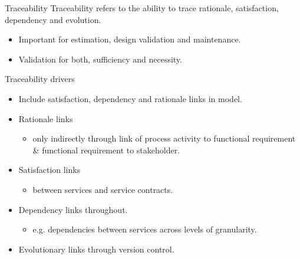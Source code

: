 
\begin{frame}{Traceability}
  Traceability refers to the ability to trace rationale, satisfaction, dependency and evolution.
    \begin{itemize}
     \item Important for estimation, design validation and maintenance.
     \item Validation for both, sufficiency and necessity.
    \end{itemize}
  \pause
  \begin{block}{Traceability drivers}
    \begin{itemize}
		\item<+-| alert@+> Include satisfaction, dependency and rationale links in model.
		\item<+-| alert@+> Rationale links
		  \begin{itemize}
		   \item  only indirectly through link of process activity to functional requirement \& functional requirement to stakeholder.
		  \end{itemize}
      \item<+-| alert@+> Satisfaction links
		  \begin{itemize}
			 \item between services and service contracts.
		  \end{itemize}
      \item<+-| alert@+> Dependency links throughout.
		  \begin{itemize}
			 \item e.g. dependencies between services across levels of granularity.
		  \end{itemize}
		\item<+-| alert@+> Evolutionary links through version control.
    \end{itemize}
  \end{block}
\end{frame}


